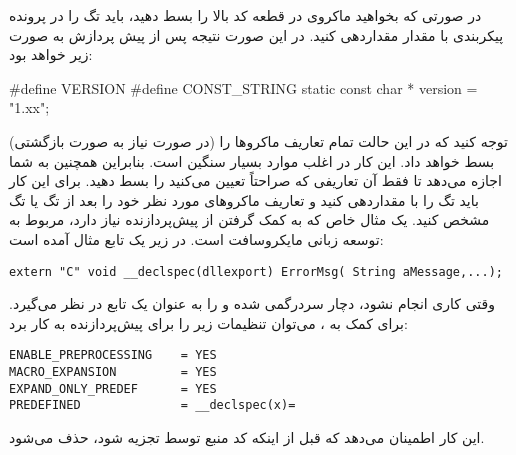 در صورتی که بخواهید ماکروی  در قطعه کد بالا را بسط دهید، باید تگ  را در 
پرونده پیکربندی با مقدار  مقداردهی کنید. در این صورت نتیجه پس از پیش پردازش به صورت زیر خواهد بود:
\begin{C++}
#define VERSION
#define CONST_STRING
static const char * version = "1.xx";
\end{C++}
توجه کنید که  در این حالت تمام تعاریف ماکروها را (در صورت نیاز به صورت  بازگشتی) بسط خواهد داد. 
این کار در اغلب موارد بسیار سنگین است. بنابراین   همچنین به شما اجازه می‌دهد تا فقط آن تعاریفی که 
صراحتاً تعیین می‌کنید را بسط دهید. برای این کار باید تگ  را با  مقداردهی کنید و 
تعاریف ماکروهای مورد نظر خود را بعد از تگ  یا تگ  مشخص کنید. 
یک مثال خاص که به کمک گرفتن از پیش‌پردازنده نیاز دارد، مربوط به توسعه زبانی  مایکروسافت است. 
در زیر یک تابع مثال آمده است:
\begin{latin}
\lstset{language=C++}  
\begin{lstlisting}[frame=single]
extern "C" void __declspec(dllexport) ErrorMsg( String aMessage,...);
\end{lstlisting}
\end{latin}
وقتی کاری انجام نشود،  دچار سردرگمی شده و  را به عنوان یک تابع در نظر می‌گیرد. 
برای کمک به ، می‌توان تنظیمات زیر را برای پیش‌پردازنده به کار برد:
\begin{latin}
\lstset{language=C++}  
\begin{lstlisting}[frame=single] 
ENABLE_PREPROCESSING    = YES
MACRO_EXPANSION         = YES
EXPAND_ONLY_PREDEF      = YES
PREDEFINED              = __declspec(x)=
\end{lstlisting}
\end{latin}
این کار اطمینان می‌دهد که قبل از اینکه کد منبع توسط  تجزیه شود،  حذف می‌شود.

